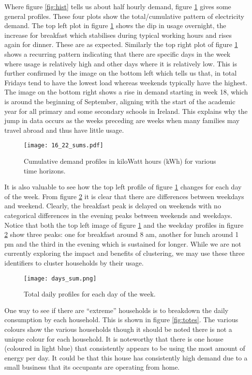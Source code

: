 Where figure \ref{fig:hist} tells us about half hourly demand, figure \ref{fig:sums} gives some general profiles. These four plots show the total/cumulative pattern of electricity demand. The top left plot in figure \ref{fig:sums} shows the dip in usage overnight, the increase for breakfast which stabilises during typical working hours and rises again for dinner. These are as expected. Similarly the top right plot of figure \ref{fig:sums} shows a recurring pattern indicating that there are specific days in the week where usage is relatively high and other days where it is relatively low. This is further confirmed by the image on the bottom left which tells us that, in total Fridays tend to have the lowest load whereas weekends typically have the highest. The image on the bottom right shows a rise in demand starting in week 18, which is around the beginning of September, aligning with the start of the academic year for all primary and some secondary schools in Ireland. This explains why the jump in data occurs as the weeks preceding are weeks when many families may travel abroad and thus have little usage.

\begin{figure}
\centering
\texttt{[image: 16\_22\_sums.pdf]}
\caption{Cumulative demand profiles in kiloWatt hours (kWh) for various time horizons.}
\label{fig:sums} 
\end{figure}

It is also valuable to see how the top left profile of figure \ref{fig:sums} changes for each day of the week. From figure \ref{fig:days} it is clear that there are differences between weekdays and weekend. Clearly, the breakfast peak is delayed on weekends with no categorical differences in the evening peaks between weekends and weekdays. Notice that both the top left image of figure \ref{fig:sums} and the weekday profiles in figure \ref{fig:days} show three peaks: one for breakfast around 8 am, another for lunch around 1 pm and the third in the evening which is sustained for longer. While we are not currently exploring the impact and benefits of clustering, we may use these three identifiers to cluster households by their usage.

\begin{figure}
\centering
\texttt{[image: days\_sum.png]}
\caption{Total daily profiles for each day of the week.}
\label{fig:days} 
\end{figure}

One way to see if there are ``extreme'' households is to breakdown the daily consumption by each household. This is shown in figure \ref{fig:totes}. The various colours show the various households though it should be noted there is not a unique colour for each household. It is noteworthy that there is one house (coloured in light blue) that consistently appears to be using the most amount of energy per day. It could be that this house has consistently high demand due to a small business that its occupants are operating from home.

